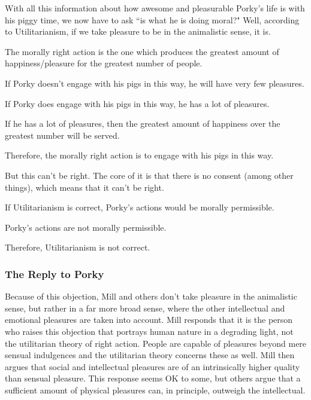 With all this information about how awesome and pleasurable Porky's life is with his piggy time, we now have to ask ``is what he is doing moral?" Well, according to Utilitarianism, if we take pleasure to be in the animalistic sense, it is.
\begin{earg}
    \item[]The morally right action is the one which produces the greatest amount of happiness/pleasure for the greatest number of people.
    \item[]If Porky doesn’t engage with his pigs in this way, he will have very few pleasures.
    \item[]If Porky does engage with his pigs in this way, he has a lot of pleasures.
    \item[]If he has a lot of pleasures, then the greatest amount of happiness over the greatest number will be served.
    \item[]Therefore, the morally right action is to engage with his pigs in this way.
\end{earg}
But this can't be right. The core of it is that there is no consent (among other things), which means that it can't be right.
\begin{earg}
    \item[]If Utilitarianism is correct, Porky’s actions would be morally permissible.
    \item[]Porky’s actions are not morally permissible.
    \item[]Therefore, Utilitarianism is not correct.
\end{earg}

\subsubsection{The Reply to Porky}

Because of this objection, Mill and others don't take pleasure in the animalistic sense, but rather in a far more broad sense, where the other intellectual and emotional pleasures are taken into account. Mill responds that it is the person who raises this objection that portrays human nature in a degrading light, not the utilitarian theory of right action. People are capable of pleasures beyond mere sensual indulgences and the utilitarian theory concerns these as well. Mill then argues that social and intellectual pleasures are of an intrinsically higher quality than sensual pleasure. This response seems OK to some, but others argue that a sufficient amount of physical pleasures can, in principle, outweigh the intellectual.


